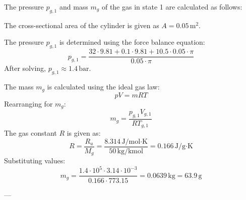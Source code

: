 The pressure \( p_{g,1} \) and mass \( m_g \) of the gas in state 1 are calculated as follows:  

The cross-sectional area of the cylinder is given as \( A = 0.05 \, \text{m}^2 \).  

The pressure \( p_{g,1} \) is determined using the force balance equation:  
\[
p_{g,1} = \frac{32 \cdot 9.81 + 0.1 \cdot 9.81 + 10.5 \cdot 0.05 \cdot \pi}{0.05 \cdot \pi}
\]  
After solving, \( p_{g,1} \approx 1.4 \, \text{bar} \).  

The mass \( m_g \) is calculated using the ideal gas law:  
\[
pV = mRT
\]  
Rearranging for \( m_g \):  
\[
m_g = \frac{p_{g,1} V_{g,1}}{R T_{g,1}}
\]  
The gas constant \( R \) is given as:  
\[
R = \frac{R_u}{M_g} = \frac{8.314 \, \text{J/mol·K}}{50 \, \text{kg/kmol}} = 0.166 \, \text{J/g·K}
\]  
Substituting values:  
\[
m_g = \frac{1.4 \cdot 10^5 \cdot 3.14 \cdot 10^{-3}}{0.166 \cdot 773.15} = 0.0639 \, \text{kg} = 63.9 \, \text{g}
\]  

---